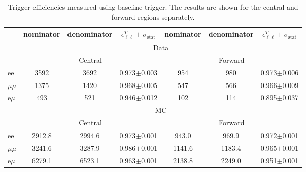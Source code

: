 
\begin{table}[hbp] \caption{Trigger efficiencies measured using \HT baseline trigger. The results are shown for the central and forward regions separately.} 
\centering 
\renewcommand{\arraystretch}{1.2} 
\begin{tabular}{l|c|c|c|c|c|c}     

 & nominator & denominator & $\epsilon_{\ell\ell}^{T} \pm \sigma_{\text{stat}}$ &  nominator & denominator & $\epsilon_{\ell\ell}^{T} \pm \sigma_{\text{stat}}$  \\ 
\hline

&\multicolumn{6}{c}{Data} \\
\hline
&  \multicolumn{3}{c|}{Central } & \multicolumn{3}{c}{ Forward }\\
\hline
ee & 3592 & 3692 & 0.973$\pm$0.003 & 954 & 980 & 0.973$\pm$0.006 \\
$\mu\mu$ & 1375 & 1420 & 0.968$\pm$0.005 & 547 & 566 & 0.966$\pm$0.009 \\
e$\mu$ & 493 & 521 & 0.946$\pm$0.012 & 102 & 114 & 0.895$\pm$0.037 \\
 
 
\hline

& \multicolumn{6}{c}{MC} \\
\hline
&  \multicolumn{3}{c|}{Central } & \multicolumn{3}{c}{ Forward } \\
\hline 
ee & 2912.8 & 2994.6 & 0.973$\pm$0.001 & 943.0 & 969.9 & 0.972$\pm$0.001 \\
$\mu\mu$ & 3241.6 & 3287.9 & 0.986$\pm$0.001 & 1141.6 & 1183.4 & 0.965$\pm$0.001 \\
e$\mu$ & 6279.1 & 6523.1 & 0.963$\pm$0.001 & 2138.8 & 2249.0 & 0.951$\pm$0.001 \\
    
    \hline 
\end{tabular}  
\label{tab:EffValues_Seperated}
\end{table}	
